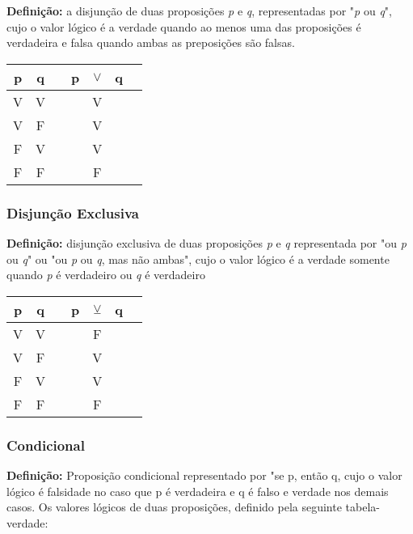 \textbf{Definição:} a disjunção de duas proposições \textit{p} e \textit{q}, representadas por "\textit{p} ou \textit{q}", cujo o valor lógico é a verdade quando ao menos uma das proposições é verdadeira e falsa quando ambas as preposições são falsas.

\begin{center}
\begin{tabular}{@{ }c@{ }@{ }c | c@{}@{ }c@{ }@{ }c@{ }@{ }c@{ }@{}c@{ }}
	p & q &  & p & $\lor$ & q & \\
	\hline 
	V & V &  &  & V &  & \\
	V & F &  &  & V &  & \\
	F & V &  &  & V &  & \\
	F & F &  &  & F &  & \\
\end{tabular}
\end{center}

		\subsubsection{Disjunção Exclusiva}
		
\textbf{Definição:} disjunção exclusiva de duas proposições \textit{p} e \textit{q} representada por "ou \textit{p} ou \textit{q}" ou "ou \textit{p} ou \textit{q}, mas não ambas", cujo o valor lógico é a verdade somente quando \textit{p} é verdadeiro ou \textit{q} é verdadeiro

\begin{center}
\begin{tabular}{@{ }c@{ }@{ }c | c@{}@{ }c@{ }@{ }c@{ }@{ }c@{ }@{}c@{ }}
	p & q &  & p & $\veebar$ & q & \\
	\hline 
	V & V &  &  & F &  & \\
	V & F &  &  & V &  & \\
	F & V &  &  & V &  & \\
	F & F &  &  & F &  & \\
\end{tabular}
\end{center}

		\subsubsection{Condicional}

\noindent \textbf{Definição:} Proposição condicional representado por "se p, então q, cujo o valor lógico é falsidade no caso que p é verdadeira e q é falso e verdade nos demais casos. Os valores lógicos de duas proposições, definido pela seguinte tabela-verdade:

